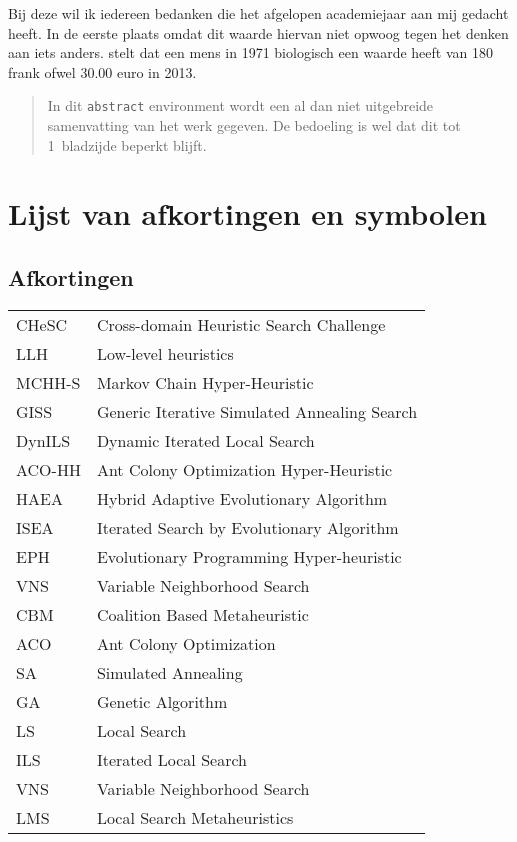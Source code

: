 \documentclass[master=elt,masteroption=ge]{kulemt}
\begin{document}
\begin{preface}
  Bij deze wil ik iedereen bedanken die het afgelopen academiejaar aan mij gedacht heeft. In de eerste plaats omdat dit waarde hiervan niet opwoog tegen het denken aan iets anders. \cite{gastonVanCamp} stelt dat een mens in 1971 biologisch een waarde heeft van 180 frank ofwel 30.00 euro in 2013.
\end{preface}

\tableofcontents*

\begin{abstract}
  In dit \texttt{abstract} environment wordt een al dan niet uitgebreide
  samenvatting van het werk gegeven. De bedoeling is wel dat dit tot
  1~bladzijde beperkt blijft.

  \lipsum[1]
\end{abstract}

\listoffiguresandtables
\chapter{Lijst van afkortingen en symbolen}
\section*{Afkortingen}
\begin{flushleft}
  \renewcommand{\arraystretch}{1.1}
  \begin{tabularx}{\textwidth}{@{}p{22mm}X@{}}%
    CHeSC	& Cross-domain Heuristic Search Challenge \\
    LLH		&Low-level heuristics \\
    MCHH-S	&Markov Chain Hyper-Heuristic\\
    GISS	&Generic Iterative Simulated Annealing Search\\
    DynILS	&Dynamic Iterated Local Search\\
    ACO-HH	&Ant Colony Optimization Hyper-Heuristic\\
    HAEA	&Hybrid Adaptive Evolutionary Algorithm\\
    ISEA	&Iterated Search by Evolutionary Algorithm\\
    EPH		&Evolutionary Programming Hyper-heuristic\\
    VNS		&Variable Neighborhood Search\\
    CBM		&Coalition Based Metaheuristic\\
    ACO		&Ant Colony Optimization\\
    SA		&Simulated Annealing\\
    GA		&Genetic Algorithm\\
    LS		&Local Search\\
    ILS		&Iterated Local Search\\
    VNS		&Variable Neighborhood Search\\
    LMS		&Local Search Metaheuristics
  \end{tabularx}
\end{flushleft}
\end{document}
